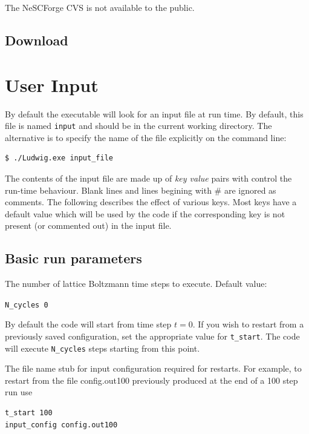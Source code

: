 The NeSCForge CVS is not available to the public.


\subsection{Download}


\section{User Input}

By default the executable will look for an input file at run time.
By default, this file is named \texttt{input} and should be in the
current working directory. The alternative is to specify the name
of the file explicitly on the command line:
\begin{verbatim}
$ ./Ludwig.exe input_file
\end{verbatim}

The contents of the input file are made up of \textit{key value}
pairs with control the run-time behaviour. Blank lines and lines
begining with \# are ignored as comments. The following describes
the effect of various keys. Most keys have a default value which
will be used by the code if the corresponding key is not present
(or commented out) in the input file.

\subsection{Basic run parameters}


The number of lattice Boltzmann time steps to execute. Default
value:

\texttt{N\_cycles 0}


By default the code will start from time step $t = 0$. If you 
wish to restart from a previously saved configuration, set
the appropriate value for \texttt{t\_start}. The code will
execute \texttt{N\_cycles} steps starting from this point.


The file name stub for input configuration required for restarts.
For example, to restart from the file config.out100 previously
produced at the end of a 100 step run use
\begin{verbatim}
t_start 100
input_config config.out100
\end{verbatim}

